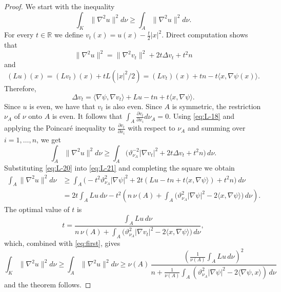 \documentclass[11pt,leqno]{article}
\theoremstyle{definition}
\theoremstyle{remark}
\numberwithin{equation}{section}
\newcommand{\gr}{\geqslant}
\newcommand{\1}{\textbf{1}}
\begin{document}
\begin{proof}We start with the inequality
\begin{equation}\label{eq:first}\int_K\|\nabla^2u\|^2d\nu\gr \int_A\|\nabla^2u\|^2d\nu .\end{equation}
For every $t\in\mathbb{R}$ we define $v_t(x)=u(x)-\frac{t}{2}|x|^2$. Direct computation shows that
\begin{equation}\label{eq:L-18}\|\nabla^2u\|^2=\|\nabla^2v_t\|^2+2t\Delta v_t+t^2n\end{equation}
and
\begin{equation}\label{eq:L-19}(Lu)(x)=(Lv_t)(x)+tL(|x|^2/2)=(Lv_t)(x)+tn-t\langle x,\nabla\psi(x)\rangle .\end{equation}
Therefore,
\begin{equation}\label{eq:L-20}\Delta v_t=\langle\nabla\psi ,\nabla v_t\rangle +Lu-tn+t\langle x,\nabla\psi\rangle .\end{equation}
Since $u$ is even, we have that $v_t$ is also even. Since $A$ is symmetric, the restriction $\nu_A$ of $\nu$ onto $A$ is even. It follows that $\int_A\frac{\partial v_t}{\partial x_i}d\nu_A=0$. 
Using \eqref{eq:L-18} and applying the Poincar\'{e} inequality to $\frac{\partial v_t}{\partial x_i}$ with respect to $\nu_A$ and summing over $i=1,\dots,n$, we get
\begin{equation}\label{eq:L-21}\int_A\|\nabla^2u\|^2d\nu\gr \int_A\big(\vartheta_{\nu_A}^{-2}|\nabla v_t|^2+2t\Delta v_t+t^2n\big)\,d\nu.\end{equation}
Substituting \eqref{eq:L-20} into \eqref{eq:L-21} and completing the square we obtain
\begin{align}\label{eq:L-22}\int_A\|\nabla^2u\|^2d\nu &\gr \int_A\big(-t^2\vartheta_{\nu_A}^2|\nabla \psi|^2+2t(Lu-tn+t\langle x,\nabla\psi\rangle )+t^2n\big)\ d\nu\\
\nonumber &=2t\int_ALu\,d\nu-t^2\left(n\,\nu(A)+\int_A\big(\vartheta_{\nu_A}^2|\nabla \psi|^2-2\langle x,\nabla\psi\rangle \big)\,d\nu\right).
\end{align}
The optimal value of $t$ is
$$t=\frac{\int_ALu\,d\nu}{n\,\nu(A)+\int_A\big(\vartheta_{\nu_A}^2|\nabla v_t|^2-2\langle x,\nabla\psi\rangle \big)\,d\nu},$$
which, combined with \eqref{eq:first}, gives
$$\int_K\|\nabla^2u\|^2d\nu\gr \int_A\|\nabla^2u\|^2d\nu\gr \nu(A)\,\frac{\left(\frac{1}{\nu(A)}\int_ALu\,d\nu\right)^2}{n+\frac{1}{\nu(A)}\int_A(\vartheta_{\nu_A}^2|\nabla \psi|^2-2\langle \nabla\psi,x\rangle) \,d\nu}$$
and the theorem follows.
\end{proof}
\end{document}
